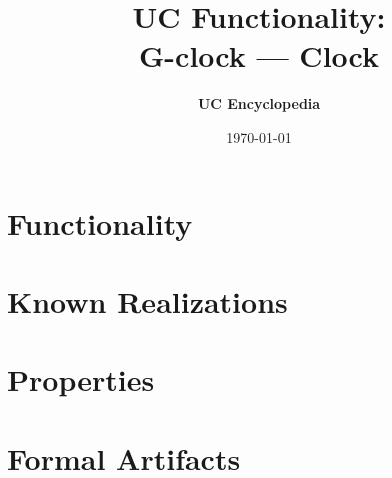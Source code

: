 \documentclass[11pt,a4paper]{article}
\title{\textbf{\Large UC Functionality:}\\[0.2em] \Large G-clock --- Clock}
\author{\textbf{UC Encyclopedia}}
\date{\today}
\newtheorem{functionality}{Functionality}
\begin{document}
\maketitle

\begin{abstract}
\end{abstract}

\section{Functionality}

%

\section{Known Realizations}


\section{Properties}


\section{Formal Artifacts}

\end{document}
